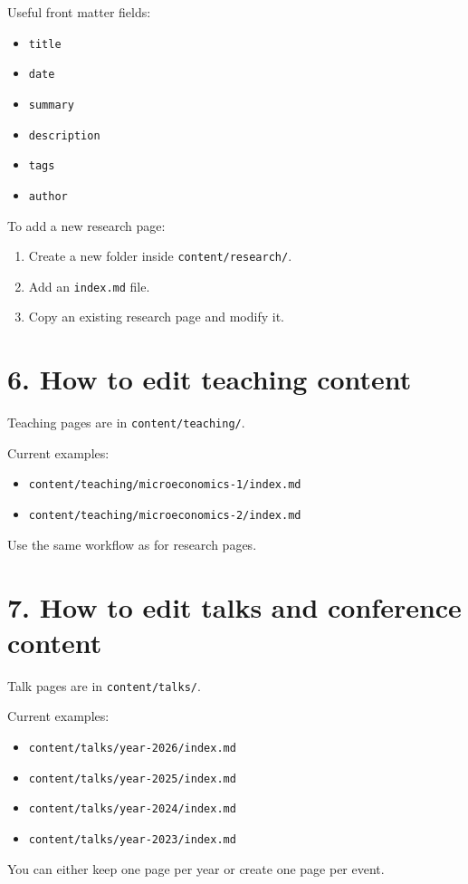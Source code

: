 \documentclass[11pt]{article}
\begin{document}
Useful front matter fields:
\begin{itemize}
\item \texttt{title}
\item \texttt{date}
\item \texttt{summary}
\item \texttt{description}
\item \texttt{tags}
\item \texttt{author}
\end{itemize}

To add a new research page:
\begin{enumerate}
\item Create a new folder inside \texttt{content/research/}.
\item Add an \texttt{index.md} file.
\item Copy an existing research page and modify it.
\end{enumerate}

\section*{6. How to edit teaching content}
Teaching pages are in \texttt{content/teaching/}.

Current examples:
\begin{itemize}
\item \texttt{content/teaching/microeconomics-1/index.md}
\item \texttt{content/teaching/microeconomics-2/index.md}
\end{itemize}

Use the same workflow as for research pages.

\section*{7. How to edit talks and conference content}
Talk pages are in \texttt{content/talks/}.

Current examples:
\begin{itemize}
\item \texttt{content/talks/year-2026/index.md}
\item \texttt{content/talks/year-2025/index.md}
\item \texttt{content/talks/year-2024/index.md}
\item \texttt{content/talks/year-2023/index.md}
\end{itemize}

You can either keep one page per year or create one page per event.
\end{document}
